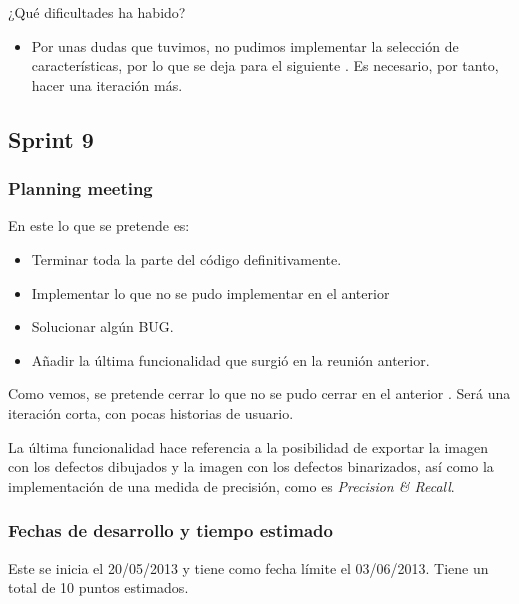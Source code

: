 ¿Qué dificultades ha habido?
\begin{itemize}
 \item Por unas dudas que tuvimos, no pudimos implementar la selección de características, por lo que se deja para el siguiente \sprint{}. Es necesario, por tanto, hacer una iteración más.
\end{itemize}

\subsection{Sprint 9}
\subsubsection*{Planning meeting}
En este \sprint{} lo que se pretende es:

\begin{itemize}
\item Terminar toda la parte del código definitivamente.
\item Implementar lo que no se pudo implementar en el anterior \sprint{}
\item Solucionar algún BUG.
\item Añadir la última funcionalidad que surgió en la reunión anterior.
\end{itemize}

Como vemos, se pretende cerrar lo que no se pudo cerrar en el anterior \sprint{}. Será una iteración corta, con pocas historias de usuario.

La última funcionalidad hace referencia a la posibilidad de exportar la imagen con los defectos dibujados y la imagen con los defectos binarizados, así como la implementación de una medida de precisión, como es \emph{Precision \& Recall}.


\subsubsection*{Fechas de desarrollo y tiempo estimado}
Este \sprint{} se inicia el 20/05/2013 y tiene como fecha límite el 03/06/2013. Tiene un total de 10 puntos estimados.


